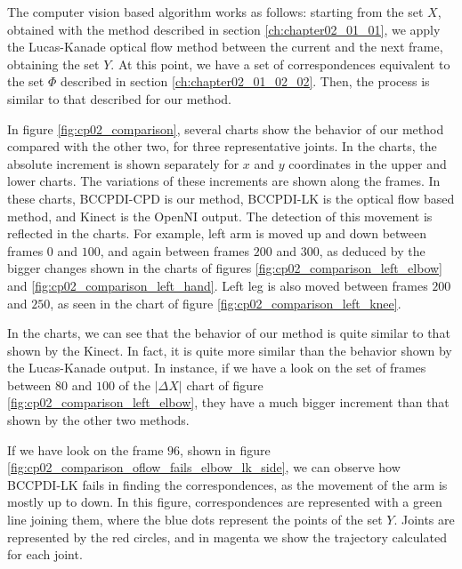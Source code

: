 The computer vision based algorithm works as follows: starting from the set $X$, obtained with the method described in 
section \ref{ch:chapter02_01_01}, we apply the Lucas-Kanade \cite{bouguet2001pyramidal} optical flow 
method between the current and the next frame, obtaining the set $Y$. At this point, we have a set of correspondences 
equivalent to the set $\Phi$ described in section \ref{ch:chapter02_01_02_02}. Then, the process is similar to 
that described for our method.

In figure \ref{fig:cp02_comparison}, several charts show the behavior of our method compared with the other two, for three 
representative joints. In the charts, the absolute increment is shown separately for $x$ and $y$ coordinates in the 
upper and lower charts. The variations of these increments are shown along the frames. In these charts, BCCPDI-CPD is 
our method, BCCPDI-LK is the optical flow based method, and Kinect is the OpenNI output.  The detection of this movement is reflected in the charts. For example, left arm is moved up and down between 
frames $0$ and $100$, and again between frames $200$ and $300$, as deduced by the bigger changes shown in the charts of 
figures \ref{fig:cp02_comparison_left_elbow} and \ref{fig:cp02_comparison_left_hand}. Left leg is also moved between frames $200$ 
and $250$, as seen in the chart of figure \ref{fig:cp02_comparison_left_knee}.

In the charts, we can see that the behavior of our method is quite similar to that shown by the Kinect. In fact, it is 
quite more similar than the behavior shown by the Lucas-Kanade output. In instance, if we have a look on the set of 
frames between $80$ and $100$ of the $|\Delta X|$ chart of figure \ref{fig:cp02_comparison_left_elbow}, they have a much 
bigger increment than that shown by the other two methods. 

If we have look on the frame $96$, shown in figure 
\ref{fig:cp02_comparison_oflow_fails_elbow_lk_side}, we can observe how BCCPDI-LK fails in finding the correspondences, as 
the movement of the arm is mostly up to down. In this figure, correspondences are represented with a green line joining 
them, where the blue dots represent the points of the set $Y$. Joints are represented by the red circles, and in magenta 
we show the trajectory calculated for each joint. 

